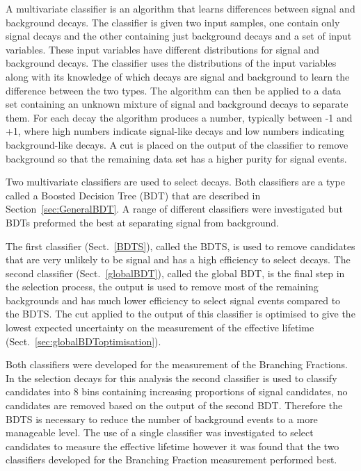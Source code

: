 A multivariate classifier is an algorithm that learns differences between signal and background decays. The classifier is given two input samples, one contain only signal decays and the other containing just background decays and a set of input variables. These input variables have different distributions for signal and background decays. The classifier uses the distributions of the input variables along with its knowledge of which decays are signal and background to learn the difference between the two types. The algorithm can then be applied to a data set containing an unknown mixture of signal and background decays to separate them. For each decay the algorithm produces a number, typically between -1 and +1, where high numbers indicate signal-like decays and low numbers indicating background-like decays. A cut is placed on the output of the classifier to remove background so that the remaining data set has a higher purity for signal events.

Two multivariate classifiers are used to select \bsmumu decays. Both classifiers are a type called a Boosted Decision Tree (BDT) that are described in Section~\ref{sec:GeneralBDT}. A range of different classifiers were investigated but BDTs preformed the best at separating signal from background. 

The first classifier (Sect.~\ref{BDTS}), called the BDTS, is used to remove candidates that are very unlikely to be signal and has a high efficiency to select \bsmumu decays. The second classifier (Sect.~\ref{globalBDT}), called the global BDT, is the final step in the selection process, the output is used to remove most of the remaining backgrounds and has much lower efficiency to select signal events compared to the BDTS. The cut applied to the output of this classifier is optimised to give the lowest expected uncertainty on the measurement of the \bsmumu effective lifetime (Sect.~\ref{sec:globalBDToptimisation}).

Both classifiers were developed for the measurement of the \bmumu Branching Fractions. In the selection \bsmumu decays for this analysis the second classifier is used to classify candidates into 8 bins containing increasing proportions of signal candidates, no candidates are removed based on the output of the second BDT. Therefore the BDTS is necessary to reduce the number of background events to a more manageable level. The use of a single classifier was investigated to select candidates to measure the \bsmumu effective lifetime however it was found that the two classifiers developed for the Branching Fraction measurement performed best. 

